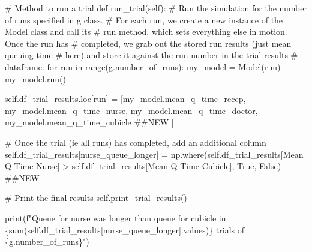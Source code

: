 \documentclass[
  letterpaper,
  DIV=11,
  numbers=noendperiod]{scrreprt}
\newenvironment{Shaded}{}{}
\newcommand{\BuiltInTok}[1]{\textcolor[rgb]{0.84,0.23,0.29}{#1}}
\newcommand{\CommentTok}[1]{\textcolor[rgb]{0.42,0.45,0.49}{#1}}
\newcommand{\ControlFlowTok}[1]{\textcolor[rgb]{0.84,0.23,0.29}{#1}}
\newcommand{\KeywordTok}[1]{\textcolor[rgb]{0.84,0.23,0.29}{#1}}
\newcommand{\NormalTok}[1]{\textcolor[rgb]{0.14,0.16,0.18}{#1}}
\newcommand{\OperatorTok}[1]{\textcolor[rgb]{0.14,0.16,0.18}{#1}}
\newcommand{\SpecialCharTok}[1]{\textcolor[rgb]{0.00,0.36,0.77}{#1}}
\newcommand{\SpecialStringTok}[1]{\textcolor[rgb]{0.01,0.18,0.38}{#1}}
\newcommand{\StringTok}[1]{\textcolor[rgb]{0.01,0.18,0.38}{#1}}
\newcommand{\VariableTok}[1]{\textcolor[rgb]{0.89,0.38,0.04}{#1}}
\begin{document}
\begin{tcolorbox}
\begin{Shaded}
\begin{Highlighting}[]
    \CommentTok{\# Method to run a trial}
    \KeywordTok{def}\NormalTok{ run\_trial(}\VariableTok{self}\NormalTok{):}
        \CommentTok{\# Run the simulation for the number of runs specified in g class.}
        \CommentTok{\# For each run, we create a new instance of the Model class and call its}
        \CommentTok{\# run method, which sets everything else in motion.  Once the run has}
        \CommentTok{\# completed, we grab out the stored run results (just mean queuing time}
        \CommentTok{\# here) and store it against the run number in the trial results}
        \CommentTok{\# dataframe.}
        \ControlFlowTok{for}\NormalTok{ run }\KeywordTok{in} \BuiltInTok{range}\NormalTok{(g.number\_of\_runs):}
\NormalTok{            my\_model }\OperatorTok{=}\NormalTok{ Model(run)}
\NormalTok{            my\_model.run()}

            \VariableTok{self}\NormalTok{.df\_trial\_results.loc[run] }\OperatorTok{=}\NormalTok{ [my\_model.mean\_q\_time\_recep,}
\NormalTok{                                              my\_model.mean\_q\_time\_nurse,}
\NormalTok{                                              my\_model.mean\_q\_time\_doctor,}
\NormalTok{                                              my\_model.mean\_q\_time\_cubicle }\CommentTok{\#\#NEW}
\NormalTok{                                              ]}

        \CommentTok{\# Once the trial (ie all runs) has completed, add an additional column}
        \VariableTok{self}\NormalTok{.df\_trial\_results[}\StringTok{\textquotesingle{}nurse\_queue\_longer\textquotesingle{}}\NormalTok{] }\OperatorTok{=}\NormalTok{ np.where(}\VariableTok{self}\NormalTok{.df\_trial\_results[}\StringTok{\textquotesingle{}Mean Q Time Nurse\textquotesingle{}}\NormalTok{] }\OperatorTok{\textgreater{}} \VariableTok{self}\NormalTok{.df\_trial\_results[}\StringTok{\textquotesingle{}Mean Q Time Cubicle\textquotesingle{}}\NormalTok{], }\VariableTok{True}\NormalTok{, }\VariableTok{False}\NormalTok{) }\CommentTok{\#\#NEW}

        \CommentTok{\# Print the final results}
        \VariableTok{self}\NormalTok{.print\_trial\_results()}

        \BuiltInTok{print}\NormalTok{(}\SpecialStringTok{f"Queue for nurse was longer than queue for cubicle in }\SpecialCharTok{\{}\BuiltInTok{sum}\NormalTok{(}\VariableTok{self}\NormalTok{.df\_trial\_results[}\StringTok{\textquotesingle{}nurse\_queue\_longer\textquotesingle{}}\NormalTok{].values)}\SpecialCharTok{\}}\SpecialStringTok{ trials of }\SpecialCharTok{\{}\NormalTok{g}\SpecialCharTok{.}\NormalTok{number\_of\_runs}\SpecialCharTok{\}}\SpecialStringTok{"}\NormalTok{)}
\end{Highlighting}
\end{Shaded}

\end{tcolorbox}
\end{document}
